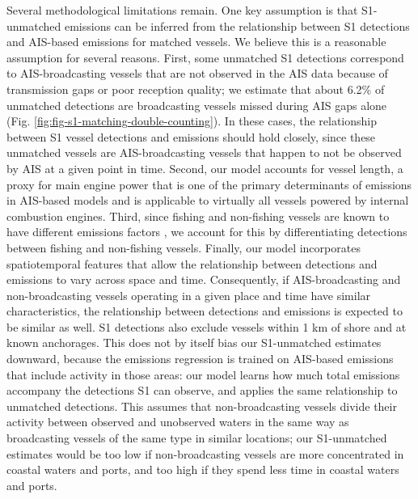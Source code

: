 \documentclass[lineno,pdflatex,sn-nature]{sn-jnl}
\begin{document}
Several methodological limitations remain. One key assumption is that S1-unmatched emissions can be inferred from the relationship between S1 detections and AIS-based emissions for matched vessels. We believe this is a reasonable assumption for several reasons. First, some unmatched S1 detections correspond to AIS-broadcasting vessels that are not observed in the AIS data because of transmission gaps or poor reception quality; we estimate that about 6.2\% of unmatched detections are broadcasting vessels missed during AIS gaps alone (Fig. \ref{fig:fig-s1-matching-double-counting}). In these cases, the relationship between S1 vessel detections and emissions should hold closely, since these unmatched vessels are AIS-broadcasting vessels that happen to not be observed by AIS at a given point in time. Second, our model accounts for vessel length, a proxy for main engine power that is one of the primary determinants of emissions in AIS-based models and is applicable to virtually all vessels powered by internal combustion engines. Third, since fishing and non-fishing vessels are known to have different emissions factors \cite{coello2015ais}, we account for this by differentiating detections between fishing and non-fishing vessels. Finally, our model incorporates spatiotemporal features that allow the relationship between detections and emissions to vary across space and time. Consequently, if AIS-broadcasting and non-broadcasting vessels operating in a given place and time have similar characteristics, the relationship between detections and emissions is expected to be similar as well. S1 detections also exclude vessels within 1 km of shore and at known anchorages. This does not by itself bias our S1-unmatched estimates downward, because the emissions regression is trained on AIS-based emissions that include activity in those areas: our model learns how much total emissions accompany the detections S1 can observe, and applies the same relationship to unmatched detections. This assumes that non-broadcasting vessels divide their activity between observed and unobserved waters in the same way as broadcasting vessels of the same type in similar locations; our S1-unmatched estimates would be too low if non-broadcasting vessels are more concentrated in coastal waters and ports, and too high if they spend less time in coastal waters and ports.
\end{document}
